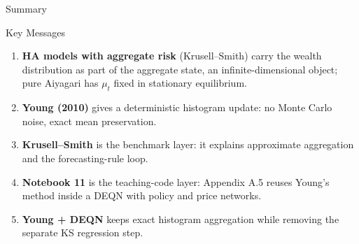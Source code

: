 \documentclass[aspectratio=169,11pt]{beamer}
\begin{document}

\begin{frame}{Summary}
\scriptsize
\begin{block}{Key Messages}
\begin{enumerate}
    \item \textbf{HA models with aggregate risk} (Krusell--Smith) carry the wealth distribution as part of the aggregate state, an infinite-dimensional object; pure Aiyagari has $\mu_t$ fixed in stationary equilibrium.
    \item \textbf{Young (2010)} gives a deterministic histogram update: no Monte Carlo noise, exact mean preservation.
    \item \textbf{Krusell--Smith} is the benchmark layer: it explains approximate aggregation and the forecasting-rule loop.
    \item \textbf{Notebook 11} is the teaching-code layer: Appendix A.5 reuses Young's method inside a DEQN with policy and price networks.
    \item \textbf{Young + DEQN} keeps exact histogram aggregation while removing the separate KS regression step.
\end{enumerate}
\end{block}
\end{frame}
\end{document}
